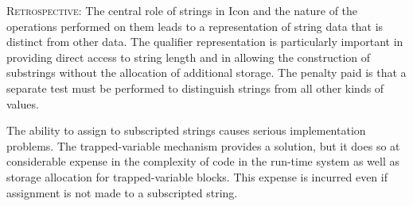 
\textsc{Retrospective}: The central role of strings in Icon and the
nature of the operations performed on them leads to a representation
of string data that is distinct from other data. The qualifier
representation is particularly important in providing direct access to
string length and in allowing the construction of substrings without
the allocation of additional storage. The penalty paid is that a
separate test must be performed to distinguish strings from all other
kinds of values.

The ability to assign to subscripted strings causes serious
implementation problems. The trapped-variable mechanism provides a
solution, but it does so at considerable expense in the complexity of
code in the run-time system as well as storage allocation for
trapped-variable blocks. This expense is incurred even if assignment
is not made to a subscripted string.

